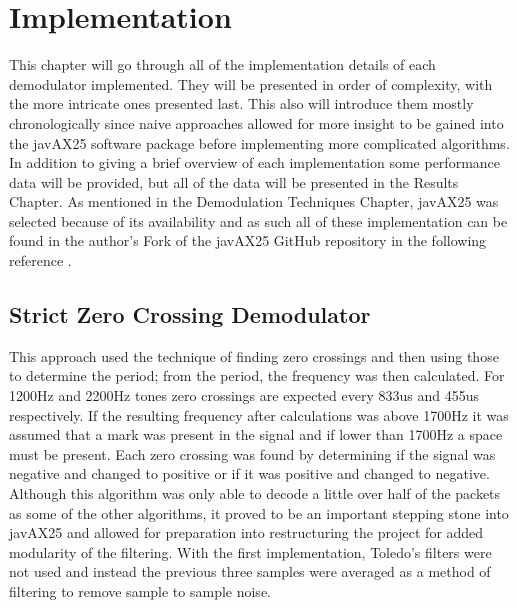 \chapter{Implementation}

This chapter will go through all of the implementation details of each demodulator implemented. They will be presented in order of complexity, with the more intricate ones presented last. This also will introduce them mostly chronologically since naive approaches allowed for more insight to be gained into the javAX25 software package before implementing more complicated algorithms. In addition to giving a brief overview of each implementation some performance data will be provided, but all of the data will be presented in the Results Chapter. As mentioned in the Demodulation Techniques Chapter, javAX25 was selected because of its availability and as such all of these implementation can be found in the author's Fork of the javAX25 GitHub repository in the following reference \cite{myJavAX25}. 

\section{Strict Zero Crossing Demodulator}
This approach used the technique of finding zero crossings and then using those to determine the period; from the period, the frequency was then calculated. For 1200Hz and 2200Hz tones zero crossings are expected every 833us and 455us respectively. If the resulting frequency after calculations was above 1700Hz it was assumed that a mark was present in the signal and if lower than 1700Hz a space must be present. Each zero crossing was found by determining if the signal was negative and changed to positive or if it was positive and changed to negative. Although this algorithm was only able to decode a little over half of the packets as some of the other algorithms, it proved to be an important stepping stone into javAX25 and allowed for preparation into restructuring the project for added modularity of the filtering. With the first implementation, Toledo's filters were not used and instead the previous three samples were averaged as a method of filtering to remove sample to sample noise.

